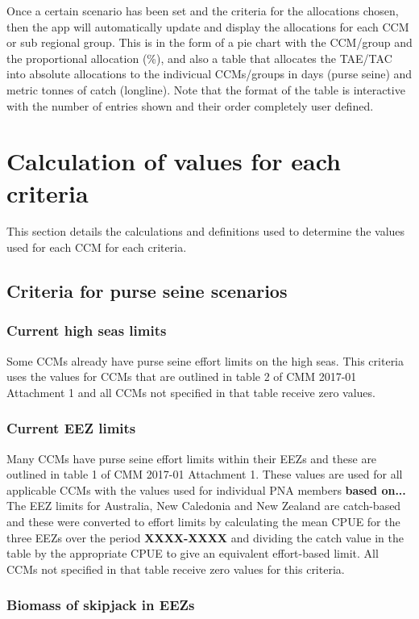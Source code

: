 \documentclass[11pt]{article}
\begin{document}
Once a certain scenario has been set and the criteria for the allocations chosen, then the app will automatically update and display the allocations for each CCM or sub regional group. This is in the form of a pie chart with the CCM/group and the proportional allocation (\%), and also a table that allocates the TAE/TAC into absolute allocations to the indivicual CCMs/groups in days (purse seine) and metric tonnes of catch (longline). Note that the format of the table is interactive with the number of entries shown and their order completely user defined.


\section{Calculation of values for each criteria}
This section details the calculations and definitions used to determine the values used for each CCM for each criteria. 

\subsection{Criteria for purse seine scenarios}

\subsubsection*{Current high seas limits}
Some CCMs already have purse seine effort limits on the high seas. This criteria uses the values for CCMs that are outlined in table 2 of CMM 2017-01 Attachment 1 and all CCMs not specified in that table receive zero values.

\subsubsection{Current EEZ limits}
Many CCMs have purse seine effort limits within their EEZs and these are outlined in table 1 of CMM 2017-01 Attachment 1. These values are used for all applicable CCMs with the values used for individual PNA members {\bf based on...} The EEZ limits for Australia, New Caledonia and New Zealand are catch-based and these were converted to effort limits by calculating the mean CPUE for the three EEZs over the period {\bf XXXX-XXXX} and dividing the catch value in the table by the appropriate CPUE to give an equivalent effort-based limit. All CCMs not specified in that table receive zero values for this criteria.

\subsubsection{Biomass of skipjack in EEZs}
\end{document}
